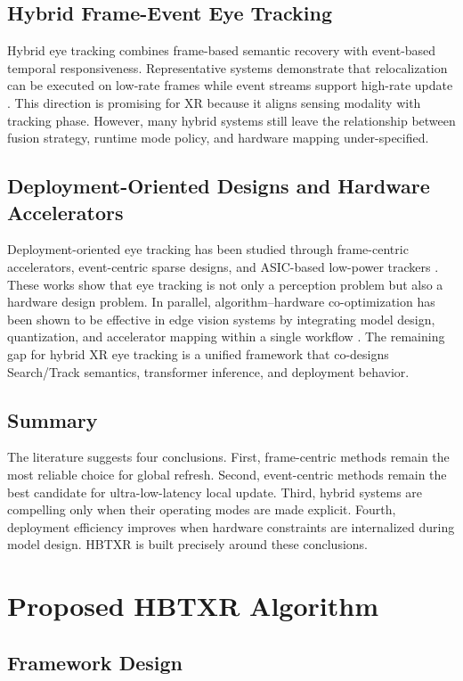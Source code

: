 \documentclass[journal]{IEEEtran}
\begin{document}
\subsection{Hybrid Frame-Event Eye Tracking}
Hybrid eye tracking combines frame-based semantic recovery with event-based temporal responsiveness. Representative systems demonstrate that relocalization can be executed on low-rate frames while event streams support high-rate update \cite{ref7}. This direction is promising for XR because it aligns sensing modality with tracking phase. However, many hybrid systems still leave the relationship between fusion strategy, runtime mode policy, and hardware mapping under-specified.

\subsection{Deployment-Oriented Designs and Hardware Accelerators}
Deployment-oriented eye tracking has been studied through frame-centric accelerators, event-centric sparse designs, and ASIC-based low-power trackers \cite{ref8,ref9,ref10}. These works show that eye tracking is not only a perception problem but also a hardware design problem. In parallel, algorithm--hardware co-optimization has been shown to be effective in edge vision systems by integrating model design, quantization, and accelerator mapping within a single workflow \cite{ref12}. The remaining gap for hybrid XR eye tracking is a unified framework that co-designs Search/Track semantics, transformer inference, and deployment behavior.

\subsection{Summary}
The literature suggests four conclusions. First, frame-centric methods remain the most reliable choice for global refresh. Second, event-centric methods remain the best candidate for ultra-low-latency local update. Third, hybrid systems are compelling only when their operating modes are made explicit. Fourth, deployment efficiency improves when hardware constraints are internalized during model design. HBTXR is built precisely around these conclusions.

\section{Proposed HBTXR Algorithm}
\subsection{Framework Design}
\end{document}
